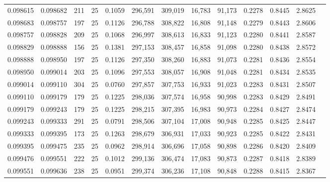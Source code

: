 \begin{tabular}{rrrrrrrrrrrrr}
0.098615 & 0.098682 &   211 &  25 &                                     0.1059 & 296,591 & 309,019 &  16,783 &  91,173 & 0.2278 & 0.8445 & 2.8625 \\
0.098683 & 0.098757 &   197 &  25 &                                     0.1126 & 296,788 & 308,822 &  16,808 &  91,148 & 0.2279 & 0.8443 & 2.8606 \\
0.098757 & 0.098828 &   209 &  25 &                                     0.1068 & 296,997 & 308,613 &  16,833 &  91,123 & 0.2280 & 0.8441 & 2.8587 \\
0.098829 & 0.098888 &   156 &  25 &                                     0.1381 & 297,153 & 308,457 &  16,858 &  91,098 & 0.2280 & 0.8438 & 2.8572 \\
0.098888 & 0.098950 &   197 &  25 &                                     0.1126 & 297,350 & 308,260 &  16,883 &  91,073 & 0.2281 & 0.8436 & 2.8554 \\
0.098950 & 0.099014 &   203 &  25 &                                     0.1096 & 297,553 & 308,057 &  16,908 &  91,048 & 0.2281 & 0.8434 & 2.8535 \\
0.099014 & 0.099110 &   304 &  25 &                                     0.0760 & 297,857 & 307,753 &  16,933 &  91,023 & 0.2283 & 0.8431 & 2.8507 \\
0.099110 & 0.099179 &   179 &  25 &                                     0.1225 & 298,036 & 307,574 &  16,958 &  90,998 & 0.2283 & 0.8429 & 2.8491 \\
0.099179 & 0.099243 &   179 &  25 &                                     0.1225 & 298,215 & 307,395 &  16,983 &  90,973 & 0.2284 & 0.8427 & 2.8474 \\
0.099243 & 0.099333 &   291 &  25 &                                     0.0791 & 298,506 & 307,104 &  17,008 &  90,948 & 0.2285 & 0.8425 & 2.8447 \\
0.099333 & 0.099395 &   173 &  25 &                                     0.1263 & 298,679 & 306,931 &  17,033 &  90,923 & 0.2285 & 0.8422 & 2.8431 \\
0.099395 & 0.099475 &   235 &  25 &                                     0.0962 & 298,914 & 306,696 &  17,058 &  90,898 & 0.2286 & 0.8420 & 2.8409 \\
0.099476 & 0.099551 &   222 &  25 &                                     0.1012 & 299,136 & 306,474 &  17,083 &  90,873 & 0.2287 & 0.8418 & 2.8389 \\
0.099551 & 0.099636 &   238 &  25 &                                     0.0951 & 299,374 & 306,236 &  17,108 &  90,848 & 0.2288 & 0.8415 & 2.8367 \\

\end{tabular}
